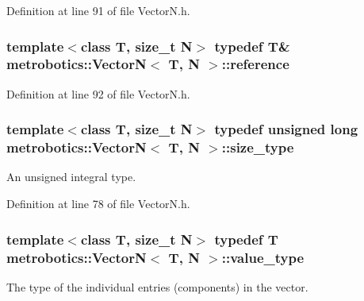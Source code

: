\-Definition at line 91 of file \-Vector\-N.\-h.

\hypertarget{classmetrobotics_1_1VectorN_a5856f36e63807f7b75703822a32b4e12}{
\subsubsection[{reference}]{\setlength{\rightskip}{0pt plus 5cm}template$<$class \-T, size\-\_\-t \-N$>$ typedef \-T\& {\bf metrobotics\-::\-Vector\-N}$<$ \-T, \-N $>$\-::{\bf reference}}}\label{classmetrobotics_1_1VectorN_a5856f36e63807f7b75703822a32b4e12}


\-Definition at line 92 of file \-Vector\-N.\-h.

\hypertarget{classmetrobotics_1_1VectorN_a596373b71834214f1c36015df71f3424}{
\subsubsection[{size\-\_\-type}]{\setlength{\rightskip}{0pt plus 5cm}template$<$class \-T, size\-\_\-t \-N$>$ typedef unsigned long {\bf metrobotics\-::\-Vector\-N}$<$ \-T, \-N $>$\-::{\bf size\-\_\-type}}}\label{classmetrobotics_1_1VectorN_a596373b71834214f1c36015df71f3424}


\-An unsigned integral type. 



\-Definition at line 78 of file \-Vector\-N.\-h.

\hypertarget{classmetrobotics_1_1VectorN_afca847c633ae36e44196da7285ce7ff6}{
\subsubsection[{value\-\_\-type}]{\setlength{\rightskip}{0pt plus 5cm}template$<$class \-T, size\-\_\-t \-N$>$ typedef \-T {\bf metrobotics\-::\-Vector\-N}$<$ \-T, \-N $>$\-::{\bf value\-\_\-type}}}\label{classmetrobotics_1_1VectorN_afca847c633ae36e44196da7285ce7ff6}


\-The type of the individual entries (components) in the vector. 

